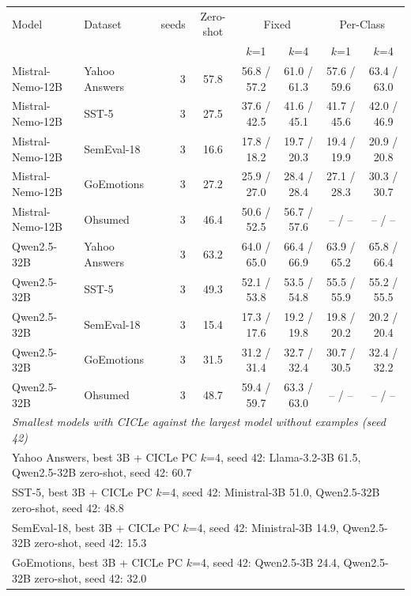 \begin{tabular}{llrccccc}
\toprule
Model & Dataset & seeds & Zero-shot & \multicolumn{2}{c}{Fixed} & \multicolumn{2}{c}{Per-Class} \\
 & & & & $k$=1 & $k$=4 & $k$=1 & $k$=4 \\
\midrule
Mistral-Nemo-12B & Yahoo Answers & 3 & 57.8 & 56.8 / 57.2 & 61.0 / 61.3 & 57.6 / 59.6 & 63.4 / 63.0 \\
Mistral-Nemo-12B & SST-5 & 3 & 27.5 & 37.6 / 42.5 & 41.6 / 45.1 & 41.7 / 45.6 & 42.0 / 46.9 \\
Mistral-Nemo-12B & SemEval-18 & 3 & 16.6 & 17.8 / 18.2 & 19.7 / 20.3 & 19.4 / 19.9 & 20.9 / 20.8 \\
Mistral-Nemo-12B & GoEmotions & 3 & 27.2 & 25.9 / 27.0 & 28.4 / 28.4 & 27.1 / 28.3 & 30.3 / 30.7 \\
Mistral-Nemo-12B & Ohsumed & 3 & 46.4 & 50.6 / 52.5 & 56.7 / 57.6 & -- / -- & -- / -- \\
\midrule
Qwen2.5-32B & Yahoo Answers & 3 & 63.2 & 64.0 / 65.0 & 66.4 / 66.9 & 63.9 / 65.2 & 65.8 / 66.4 \\
Qwen2.5-32B & SST-5 & 3 & 49.3 & 52.1 / 53.8 & 53.5 / 54.8 & 55.5 / 55.9 & 55.2 / 55.5 \\
Qwen2.5-32B & SemEval-18 & 3 & 15.4 & 17.3 / 17.6 & 19.2 / 19.8 & 19.8 / 20.2 & 20.2 / 20.4 \\
Qwen2.5-32B & GoEmotions & 3 & 31.5 & 31.2 / 31.4 & 32.7 / 32.4 & 30.7 / 30.5 & 32.4 / 32.2 \\
Qwen2.5-32B & Ohsumed & 3 & 48.7 & 59.4 / 59.7 & 63.3 / 63.0 & -- / -- & -- / -- \\
\midrule
\multicolumn{8}{l}{\emph{Smallest models with CICLe against the largest model without examples (seed 42)}} \\
\multicolumn{8}{l}{Yahoo Answers, best 3B + CICLe PC $k$=4, seed 42: Llama-3.2-3B 61.5, Qwen2.5-32B zero-shot, seed 42: 60.7} \\
\multicolumn{8}{l}{SST-5, best 3B + CICLe PC $k$=4, seed 42: Ministral-3B 51.0, Qwen2.5-32B zero-shot, seed 42: 48.8} \\
\multicolumn{8}{l}{SemEval-18, best 3B + CICLe PC $k$=4, seed 42: Ministral-3B 14.9, Qwen2.5-32B zero-shot, seed 42: 15.3} \\
\multicolumn{8}{l}{GoEmotions, best 3B + CICLe PC $k$=4, seed 42: Qwen2.5-3B 24.4, Qwen2.5-32B zero-shot, seed 42: 32.0} \\
\bottomrule
\end{tabular}
